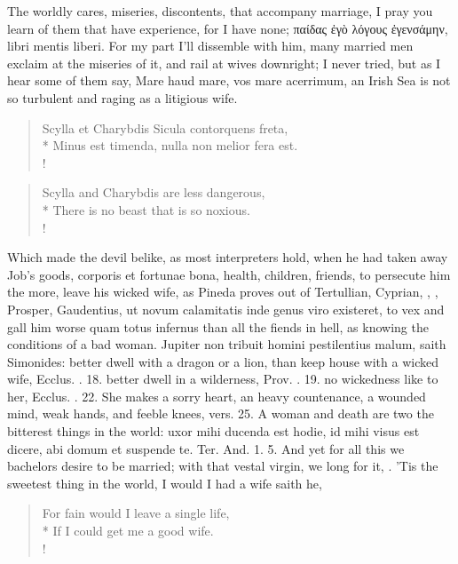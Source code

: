 The worldly cares, miseries, discontents, that accompany marriage, I
pray you learn of them that have experience, for I have none; 
\textgreek{παίδας ἐγὸ λόγους ἐγενσάμην}, libri mentis liberi. For my part I'll
dissemble with him,
%
%
many married men exclaim at the miseries of it, and rail at wives
downright; I never tried, but as I hear some of them say, Mare
haud mare, vos mare acerrimum, an Irish Sea is not so turbulent and
raging as a litigious wife.
%
\begin{latin}%
\begin{verse}%
Scylla et Charybdis Sicula contorquens freta,\\*
Minus est timenda, nulla non melior fera est.\\!
\end{verse}%
\end{latin}%
\translationrule%
\begin{verse}%
Scylla and Charybdis are less dangerous,\\*
There is no beast that is so noxious.\\!
\end{verse}%
%

Which made the devil belike, as most interpreters hold, when he had
taken away Job's goods, corporis et fortunae bona, health, children,
friends, to persecute him the more, leave his wicked wife, as Pineda
proves out of Tertullian, Cyprian, \Austin{}, \Chrysostom{}, Prosper,
Gaudentius, \etc{} ut novum calamitatis inde genus viro existeret, to vex
and gall him worse quam totus infernus than all the fiends in hell, as
knowing the conditions of a bad woman. Jupiter non tribuit homini
pestilentius malum, saith Simonides: better dwell with a dragon or a
lion, than keep house with a wicked wife, Ecclus. . 18. better dwell
in a wilderness, Prov. . 19. no wickedness like to her, Ecclus. .
22. She makes a sorry heart, an heavy countenance, a wounded mind, weak
hands, and feeble knees, vers. 25. A woman and death are two the
bitterest things in the world: uxor mihi ducenda est hodie, id mihi
visus est dicere, abi domum et suspende te. Ter. And. 1. 5. And yet for
all this we bachelors desire to be married; with that vestal virgin, we
long for it, . 'Tis
the sweetest thing in the world, I would I had a wife saith he,
%
\begin{verse}%
For fain would I leave a single life,\\*
If I could get me a good wife.\\!
\end{verse}%

